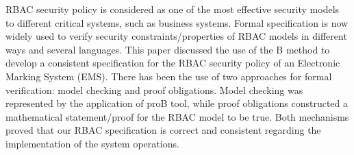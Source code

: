 RBAC security policy is considered as one of the most effective security models to different critical systems, such as business systems.  Formal specification is now widely used to verify security constraints/properties of RBAC models in different ways and several languages.  This paper discussed the use of the B method to develop a consistent specification for the RBAC security policy of an Electronic Marking System (EMS).   There has been the use of two approaches for formal verification: model checking and proof obligations.  Model checking was represented by the application of proB tool, while proof obligations constructed a mathematical statement/proof for the RBAC model to be true.  Both mechanisms proved that our RBAC specification is correct and consistent regarding the implementation of the system operations.
